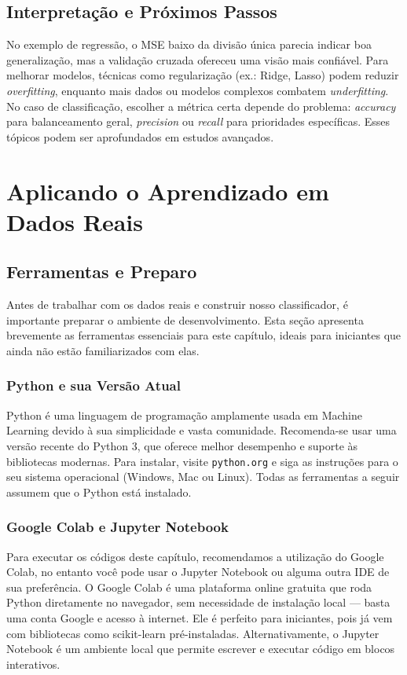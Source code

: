 \documentclass[a4paper,12pt,openany]{book}
\begin{document}
\section{Interpretação e Próximos Passos}

No exemplo de regressão, o MSE baixo da divisão única parecia indicar boa generalização, mas a validação cruzada ofereceu uma visão mais confiável. Para melhorar modelos, técnicas como regularização (ex.: Ridge, Lasso) podem reduzir \textit{overfitting}, enquanto mais dados ou modelos complexos combatem \textit{underfitting}. No caso de classificação, escolher a métrica certa depende do problema: \textit{accuracy} para balanceamento geral, \textit{precision} ou \textit{recall} para prioridades específicas. Esses tópicos podem ser aprofundados em estudos avançados.

\chapter{Aplicando o Aprendizado em Dados Reais}

\section{Ferramentas e Preparo}
Antes de trabalhar com os dados reais e construir nosso classificador, é importante preparar o ambiente de desenvolvimento. Esta seção apresenta brevemente as ferramentas essenciais para este capítulo, ideais para iniciantes que ainda não estão familiarizados com elas.

\subsection{Python e sua Versão Atual}
Python é uma linguagem de programação amplamente usada em Machine Learning devido à sua simplicidade e vasta comunidade. Recomenda-se usar uma versão recente do Python 3, que oferece melhor desempenho e suporte às bibliotecas modernas. Para instalar, visite \texttt{python.org} e siga as instruções para o seu sistema operacional (Windows, Mac ou Linux). Todas as ferramentas a seguir assumem que o Python está instalado.

\subsection{Google Colab e Jupyter Notebook}
Para executar os códigos deste capítulo, recomendamos a utilização do Google Colab, no entanto você pode usar o Jupyter Notebook ou alguma outra IDE de sua preferência. O Google Colab é uma plataforma online gratuita que roda Python diretamente no navegador, sem necessidade de instalação local --- basta uma conta Google e acesso à internet. Ele é perfeito para iniciantes, pois já vem com bibliotecas como scikit-learn pré-instaladas. Alternativamente, o Jupyter Notebook é um ambiente local que permite escrever e executar código em blocos interativos.
\end{document}

